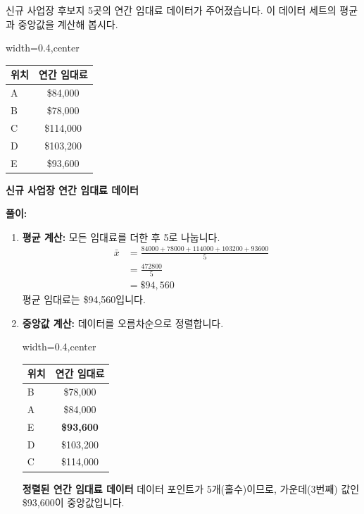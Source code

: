 \documentclass[11pt,a4paper]{book}
\providecommand{\captionof}[2]{\textbf{#2}}
\theoremstyle{definition}
\begin{document}
\begin{examplebox}[title=연습 문제: 신규 사업장 연간 임대료]
신규 사업장 후보지 5곳의 연간 임대료 데이터가 주어졌습니다. 이 데이터 세트의 평균과 중앙값을 계산해 봅시다.

\begin{adjustbox}{width=0.4\textwidth,center}
\begin{tabular}{lc}
\toprule
\textbf{위치} & \textbf{연간 임대료} \\
\midrule
A & \$84,000 \\
B & \$78,000 \\
C & \$114,000 \\
D & \$103,200 \\
E & \$93,600 \\
\bottomrule
\end{tabular}
\end{adjustbox}
\captionof{table}{신규 사업장 연간 임대료 데이터}
\label{tab:rental_data}

\textbf{풀이:}
\begin{enumerate}
    \item \textbf{평균 계산:} 모든 임대료를 더한 후 5로 나눕니다.
    \begin{align*}
        \bar{x} &= \frac{84000 + 78000 + 114000 + 103200 + 93600}{5} \\
        &= \frac{472800}{5} \\
        &= \$94,560
    \end{align*}
    평균 임대료는 \$94,560입니다.

    \item \textbf{중앙값 계산:} 데이터를 오름차순으로 정렬합니다.
    \begin{adjustbox}{width=0.4\textwidth,center}
    \begin{tabular}{lc}
    \toprule
    \textbf{위치} & \textbf{연간 임대료} \\
    \midrule
    B & \$78,000 \\
    A & \$84,000 \\
    E & \textbf{\$93,600} \\ %
    D & \$103,200 \\
    C & \$114,000 \\
    \bottomrule
    \end{tabular}
    \end{adjustbox}
    \captionof{table}{정렬된 연간 임대료 데이터}
    \label{tab:rental_data_sorted}
    데이터 포인트가 5개(홀수)이므로, 가운데(3번째) 값인 \$93,600이 중앙값입니다.
\end{enumerate}
\end{examplebox}
\end{document}
